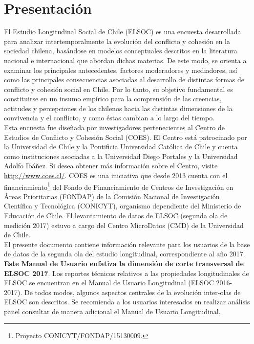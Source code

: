 \documentclass[12pt]{report}
\begin{document}

\section*{Presentación}

El Estudio Longitudinal  Social de Chile (ELSOC) es una encuesta desarrollada para analizar intertemporalmente la evolución del conflicto y cohesión en la sociedad chilena, basándose en modelos conceptuales descritos en la literatura nacional e internacional que abordan dichas materias. De este modo, se orienta a examinar los principales antecedentes, factores moderadores y mediadores, así como las principales consecuencias asociadas al desarrollo de distintas formas de conflicto y cohesión social en Chile. Por lo tanto, su objetivo fundamental es constituirse en un insumo empírico para la comprensión de las creencias, actitudes y percepciones de los chilenos hacia las distintas dimensiones de la convivencia y el conflicto, y como éstas cambian a lo largo del tiempo.\\

Esta encuesta fue diseñada por investigadores pertenecientes al Centro de Estudios de Conflicto y Cohesión Social (COES). El Centro está patrocinado por la Universidad de Chile y la Pontificia Universidad Católica de Chile y cuenta como instituciones asociadas a la Universidad Diego Portales y la Universidad Adolfo Ibáñez. Si desea obtener más información sobre el Centro, visite \url{http://www.coes.cl/}. COES es una iniciativa que desde 2013 cuenta con el financiamiento\footnote{Proyecto CONICYT/FONDAP/15130009.} del Fondo de Financiamiento de Centros de Investigación en Áreas Prioritarias (FONDAP) de la Comisión Nacional de Investigación Científica y Tecnológica (CONICYT), organismo dependiente del Ministerio de Educación de Chile. El levantamiento de datos de ELSOC (segunda ola de medición 2017) estuvo a cargo del Centro MicroDatos (CMD) de la Universidad de Chile.\\

El presente documento contiene  información relevante para los usuarios de la base de datos de la segunda ola del estudio longitudinal, correspondiente al año 2017. \textbf{Este Manual de Usuario enfatiza la dimensión de corte transversal de ELSOC 2017}. Los reportes técnicos relativos a las propiedades longitudinales de ELSOC se encuentran en el Manual de Usuario Longitudinal (ELSOC 2016-2017). De todos modos, algunos aspectos centrales de la evolución inter-olas de ELSOC son descritos. Se recomienda a los usuarios interesados en realizar análisis panel consultar de manera adicional el Manual de Usuario Longitudinal.
\end{document}
